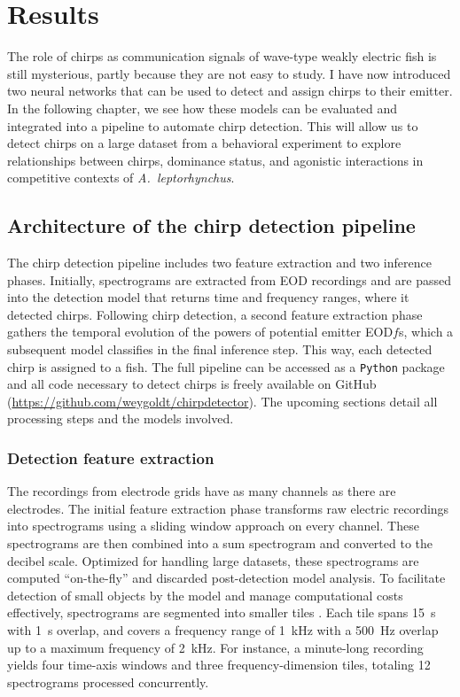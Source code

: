 \chapter{Results} %
\label{chap:results}

The role of chirps as communication signals of wave-type weakly electric fish
is still mysterious, partly because they are not easy to study. I have now
introduced two neural networks that can be used to detect and assign chirps to
their emitter. In the following chapter, we see how these models can be
evaluated and integrated into a pipeline to automate chirp detection. This will
allow us to detect chirps on a large dataset from a behavioral experiment to
explore relationships between chirps, dominance status, and agonistic
interactions in competitive contexts of \textit{A.~leptorhynchus}.

\section{Architecture of the chirp detection pipeline} %
\label{sec:the_pipeline}

The chirp detection pipeline includes two feature extraction and two inference
phases. Initially, spectrograms are extracted from EOD recordings and are
passed into the detection model that returns time and frequency ranges, where
it detected chirps. Following chirp detection, a second feature extraction
phase gathers the temporal evolution of the powers of potential emitter
EOD$f$s, which a subsequent model classifies in the final inference step. This
way, each detected chirp is assigned to a fish. The full pipeline can be
accessed as a \texttt{Python} package and all code necessary to detect chirps
is freely available on GitHub
(\url{https://github.com/weygoldt/chirpdetector}). The upcoming sections detail
all processing steps and the models involved.

\subsection{Detection feature extraction}

The recordings from electrode grids have as many channels as there are
electrodes. The initial feature extraction phase transforms raw electric
recordings into spectrograms using a sliding window approach on every channel.
These spectrograms are then combined into a sum spectrogram and converted to
the decibel scale. Optimized for handling large datasets, these spectrograms
are computed \enquote{on-the-fly} and discarded post-detection model analysis.
To facilitate detection of small objects by the model and manage computational
costs effectively, spectrograms are segmented into smaller tiles
\parencite{huangTilingStitchingSegmentation2019}. Each tile spans
\SI{15}{\second} with \SI{1}{\second} overlap, and covers a frequency range of
\SI{1}{\kilo\hertz} with a \SI{500}{\hertz} overlap up to a maximum frequency
of \SI{2}{\kilo\hertz}. For instance, a minute-long recording yields four
time-axis windows and three frequency-dimension tiles, totaling 12 spectrograms
processed concurrently.

